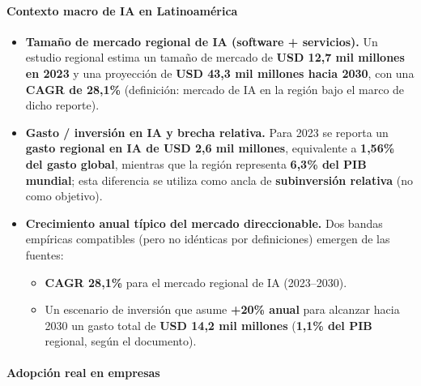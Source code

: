 \paragraph{Contexto macro de IA en Latinoamérica}

\begin{itemize}
  \item \textbf{Tamaño de mercado regional de IA (software + servicios).} Un estudio regional estima un tamaño de mercado de \textbf{USD 12{,}7 mil millones en 2023} y una proyección de \textbf{USD 43{,}3 mil millones hacia 2030}, con una \textbf{CAGR de 28{,}1\%} (definición: mercado de IA en la región bajo el marco de dicho reporte). \parencite{GerosaHermansen2025EconomicWorkforceAI}

  \item \textbf{Gasto / inversión en IA y brecha relativa.} Para 2023 se reporta un \textbf{gasto regional en IA de USD 2{,}6 mil millones}, equivalente a \textbf{1{,}56\% del gasto global}, mientras que la región representa \textbf{6{,}3\% del PIB mundial}; esta diferencia se utiliza como ancla de \textbf{subinversión relativa} (no como objetivo). \parencite{JungKatz2025ImpactoEconomicoIAALC}

  \item \textbf{Crecimiento anual típico del mercado direccionable.} Dos bandas empíricas compatibles (pero no idénticas por definiciones) emergen de las fuentes:
  \begin{itemize}
    \item \textbf{CAGR 28{,}1\%} para el mercado regional de IA (2023--2030). \parencite{GerosaHermansen2025EconomicWorkforceAI}
    \item Un escenario de inversión que asume \textbf{+20\% anual} para alcanzar hacia 2030 un gasto total de \textbf{USD 14{,}2 mil millones} (\textbf{1{,}1\% del PIB} regional, según el documento). \parencite{JungKatz2025ImpactoEconomicoIAALC}
  \end{itemize}
\end{itemize}

\paragraph{Adopción real en empresas}

